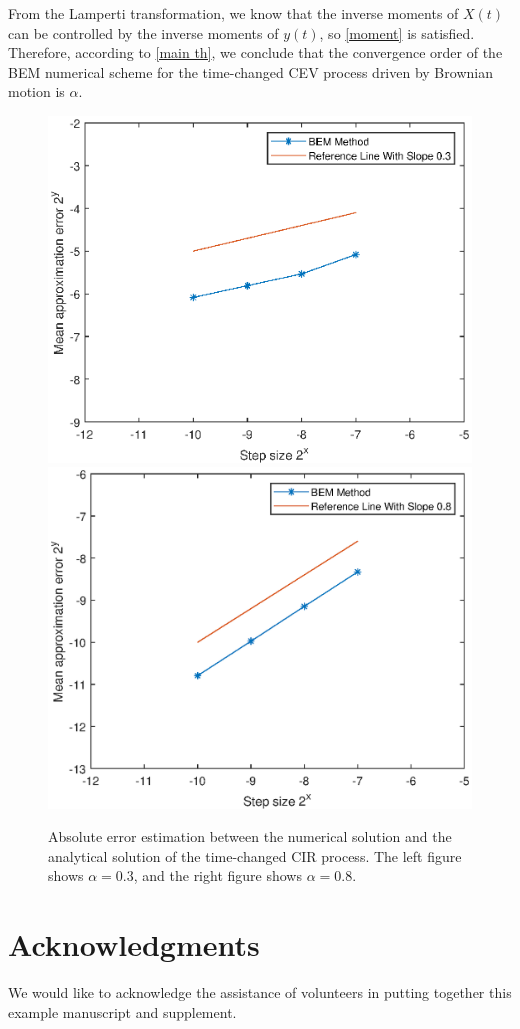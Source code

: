 \documentclass[10pt,reqno,final]{amsart}
\theoremstyle{plain}
\newtheorem{lemma}{Lemma}[section]
\theoremstyle{definition}
\theoremstyle{remark}
\numberwithin{equation}{section}
\numberwithin{figure}{section}
\numberwithin{table}{section}
\begin{document}
From the Lamperti transformation, we know that the inverse moments of $X(t)$ can be controlled by the inverse moments of $y(t)$, so \cref{moment} is satisfied. Therefore, according to \cref{main th}, we conclude that the convergence order of the BEM numerical scheme for the time-changed CEV process driven by Brownian motion is $\alpha$.

\begin{figure}[htp!]
	\centering
	\includegraphics[width=0.45\linewidth]{BEMalpha=0.3.eps}
	\hfill
	\includegraphics[width=0.45\linewidth]{BEMalpha=0.8.eps}
	\caption{Absolute error estimation between the numerical solution and the analytical solution of the time-changed CIR process. The left figure shows $\alpha=0.3$, and the right figure shows $\alpha=0.8$.}
	\label{fig:image}
	\vspace{-2ex}
\end{figure}

%
%
%


\section*{Acknowledgments}

We would like to acknowledge the assistance of volunteers in putting together this example manuscript and supplement.



%


\end{document}
